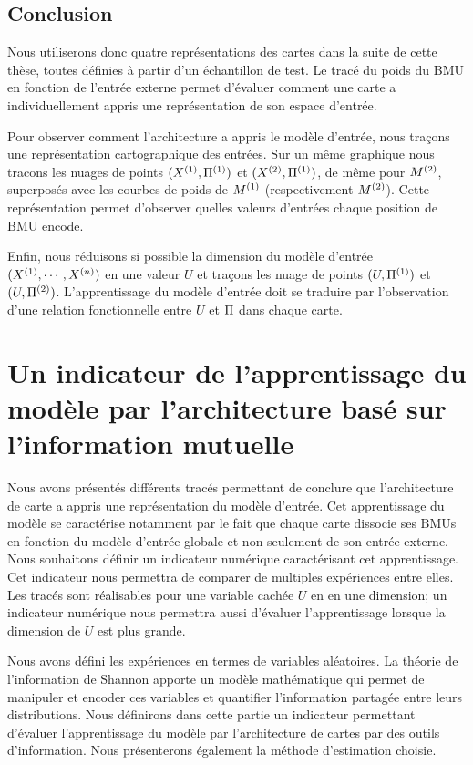 \subsection{Conclusion}

Nous utiliserons donc quatre représentations des cartes dans la suite de cette thèse, toutes définies à partir d'un échantillon de test.
Le tracé du poids du BMU en fonction de l'entrée externe permet d'évaluer comment une carte a individuellement appris une représentation de son espace d'entrée. 


Pour observer comment l'architecture a appris le modèle d'entrée, nous traçons une représentation cartographique des entrées. Sur un même graphique nous tracons les nuages de points $(X^{({1})},\Pi^{({1})})$ et $(X^{({2})},\Pi^{({1})})$, de même pour $M^{({2})}$, superposés avec les courbes de poids de $M^{({1})}$ (respectivement $M^{({2})}$). Cette représentation permet d'observer quelles valeurs d'entrées chaque position de BMU encode.

Enfin, nous réduisons si possible la dimension du modèle d'entrée $(X^{({1})},\cdots,X^{({n})})$ en une valeur $U$ et traçons les nuage de points $(U,\Pi^{({1})})$ et $(U,\Pi^{({2})})$. L'apprentissage du modèle d'entrée doit se traduire par l'observation d'une relation fonctionnelle entre $U$ et $\Pi$ dans chaque carte.



\section{Un indicateur de l'apprentissage du modèle par l'architecture basé sur l'information mutuelle}

Nous avons présentés différents tracés permettant de conclure que l'architecture de carte a appris une représentation du modèle d'entrée. Cet apprentissage du modèle se caractérise notamment par le fait que chaque carte dissocie ses BMUs en fonction du modèle d'entrée globale et non seulement de son entrée externe. 
Nous souhaitons définir un indicateur numérique caractérisant cet apprentissage. Cet indicateur nous permettra de comparer de multiples expériences entre elles. Les tracés sont réalisables pour une variable cachée $U$ en en une dimension; un indicateur numérique nous permettra aussi d'évaluer l'apprentissage lorsque la dimension de $U$ est plus grande.

Nous avons défini les expériences en termes de variables aléatoires. La théorie de l'information de Shannon \cite{Shannon1948AMT} apporte un modèle mathématique qui permet de manipuler et encoder ces variables et quantifier l'information partagée entre leurs distributions.
Nous définirons dans cette partie un indicateur permettant d'évaluer l'apprentissage du modèle par l'architecture de cartes par des outils d'information. Nous présenterons également la méthode d'estimation choisie. 

